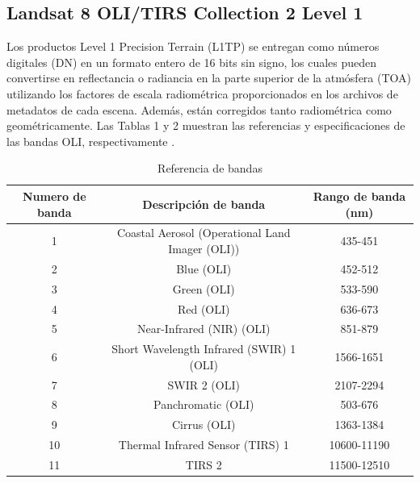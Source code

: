 	
	\subsection{Landsat 8 OLI/TIRS Collection 2 Level 1}
	
	Los productos Level 1 Precision Terrain (L1TP) se entregan como números digitales (DN) en un formato entero de 16 bits sin signo, los cuales pueden convertirse en reflectancia o radiancia en la parte superior de la atmósfera (TOA) utilizando los factores de escala radiométrica proporcionados en los archivos de metadatos de cada escena. Además, están corregidos tanto radiométrica como geométricamente. Las Tablas 1 y 2 muestran las referencias y especificaciones de las bandas OLI, respectivamente \parencite{landsat8}.
	
	\begin{table}[h!]
		\centering
		\begin{tabular}{|c|c|c|}
			\hline
			\textbf{Numero de banda} & \textbf{Descripción de banda} &\textbf{Rango de banda (nm)}\\
			\hline
			1  & Coastal Aerosol (Operational Land
			Imager (OLI)) & 435-451\\
			2 & Blue (OLI) & 452-512\\
			3 & Green (OLI) & 533-590 \\
			4 & Red (OLI) & 636-673 \\
			5 & Near-Infrared (NIR) (OLI) & 851-879 \\
			6 & Short Wavelength Infrared (SWIR) 1
			(OLI) & 1566-1651 \\
			7 & SWIR 2 (OLI) & 2107-2294 \\
			8 & Panchromatic (OLI)  & 503-676\\
			9 & Cirrus (OLI)  & 1363-1384 \\
			10 & Thermal Infrared Sensor (TIRS) 1 & 10600-11190 \\
			11 & TIRS 2  & 11500-12510 \\
			
			\hline
		\end{tabular}
		\caption{Referencia de bandas}
		\label{tabla2.1}
	\end{table}
	
	
	
